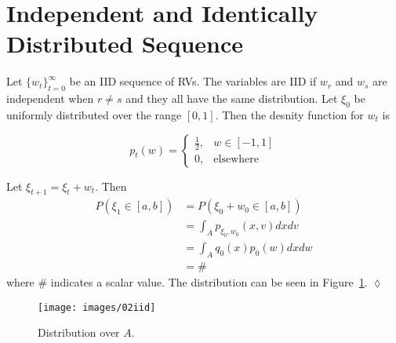 \section{Independent and Identically Distributed Sequence}
\begin{example}
Let $\lbrace w_t\rbrace_{t=0}^\infty$ be an IID sequence of RVs.
The variables are IID if $w_r$ and $w_s$ are independent when $r\neq s$ and they all have the same distribution.
Let $\xi_0$ be uniformly distributed over the range $[0,1]$.
Then the desnity function for $w_t$ is

\begin{equation*}
p_t(w) = \begin{cases} \frac{1}{2}, & w\in[-1,1] \\ 0, & \text{elsewhere} \end{cases}
\end{equation*}

Let $\xi_{t+1}=\xi_t+w_t$.
Then
\begin{align*}
P(\xi_1\in[a,b]) &= P(\xi_0 + w_0\in[a,b]) \\
&= \int_A p_{\xi_0,w_0}(x,v)dxdv \\
&= \int_A q_0(x)p_0(w)dxdw \\
&= \#
\end{align*}
where $\#$ indicates a scalar value.
The distribution can be seen in Figure~\ref{fig:02iid}.
$\lozenge$
\end{example}

\begin{figure}[ht!]
\centering
\texttt{[image: images/02iid]}
\caption{Distribution over $A$.}%
\label{fig:02iid}
\end{figure}%

